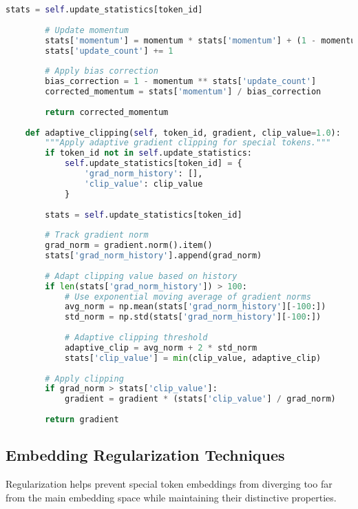 \begin{lstlisting}[language=Python, caption=Adaptive embedding update strategies]
        stats = self.update_statistics[token_id]
        
        # Update momentum
        stats['momentum'] = momentum * stats['momentum'] + (1 - momentum) * gradient
        stats['update_count'] += 1
        
        # Apply bias correction
        bias_correction = 1 - momentum ** stats['update_count']
        corrected_momentum = stats['momentum'] / bias_correction
        
        return corrected_momentum
        
    def adaptive_clipping(self, token_id, gradient, clip_value=1.0):
        """Apply adaptive gradient clipping for special tokens."""
        if token_id not in self.update_statistics:
            self.update_statistics[token_id] = {
                'grad_norm_history': [],
                'clip_value': clip_value
            }
            
        stats = self.update_statistics[token_id]
        
        # Track gradient norm
        grad_norm = gradient.norm().item()
        stats['grad_norm_history'].append(grad_norm)
        
        # Adapt clipping value based on history
        if len(stats['grad_norm_history']) > 100:
            # Use exponential moving average of gradient norms
            avg_norm = np.mean(stats['grad_norm_history'][-100:])
            std_norm = np.std(stats['grad_norm_history'][-100:])
            
            # Adaptive clipping threshold
            adaptive_clip = avg_norm + 2 * std_norm
            stats['clip_value'] = min(clip_value, adaptive_clip)
            
        # Apply clipping
        if grad_norm > stats['clip_value']:
            gradient = gradient * (stats['clip_value'] / grad_norm)
            
        return gradient
\end{lstlisting}

\subsection{Embedding Regularization Techniques}

Regularization helps prevent special token embeddings from diverging too far from the main embedding space while maintaining their distinctive properties.

